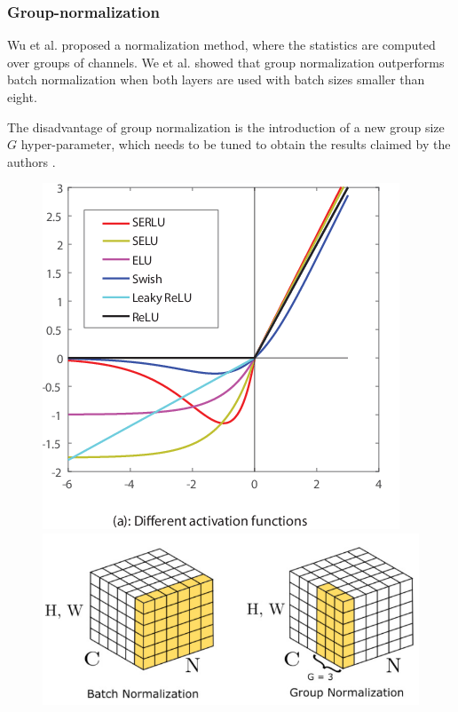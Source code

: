 \subsubsection{Group-normalization}
\label{sec:group_norm}
Wu et al. \cite{Wu2018} proposed a normalization method, where the statistics are computed over groups of channels. We et al. showed that group normalization outperforms batch normalization when both layers are used with batch sizes smaller than eight.

The disadvantage of group normalization is the introduction of a new group size $G$ hyper-parameter, which needs to be tuned to obtain the results claimed by the authors \cite{Wu2018}.

\begin{figure}
    \begin{floatrow}[2]
        {\includegraphics[width=\linewidth]{images/activation_functions.png}}\quad
        {\includegraphics[width=\linewidth]{images/group_batch_norm.png}}
    \end{floatrow}
\end{figure}



